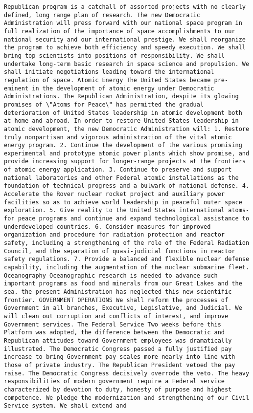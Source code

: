\documentclass[
]{article}
\begin{document}
\begin{verbatim}
Republican program is a catchall of assorted projects with no clearly defined, long range plan of research. The new Democratic Administration will press forward with our national space program in full realization of the importance of space accomplishments to our national security and our international prestige. We shall reorganize the program to achieve both efficiency and speedy execution. We shall bring top scientists into positions of responsibility. We shall undertake long-term basic research in space science and propulsion. We shall initiate negotiations leading toward the international regulation of space. Atomic Energy The United States became pre-eminent in the development of atomic energy under Democratic Administrations. The Republican Administration, despite its glowing promises of \"Atoms for Peace\" has permitted the gradual deterioration of United States leadership in atomic development both at home and abroad. In order to restore United States leadership in atomic development, the new Democratic Administration will: 1. Restore truly nonpartisan and vigorous administration of the vital atomic energy program. 2. Continue the development of the various promising experimental and prototype atomic power plants which show promise, and provide increasing support for longer-range projects at the frontiers of atomic energy application. 3. Continue to preserve and support national laboratories and other Federal atomic installations as the foundation of technical progress and a bulwark of national defense. 4. Accelerate the Rover nuclear rocket project and auxiliary power facilities so as to achieve world leadership in peaceful outer space exploration. 5. Give reality to the United States international atoms-for peace programs and continue and expand technological assistance to underdeveloped countries. 6. Consider measures for improved organization and procedure for radiation protection and reactor safety, including a strengthening of the role of the Federal Radiation Council, and the separation of quasi-judicial functions in reactor safety regulations. 7. Provide a balanced and flexible nuclear defense capability, including the augmentation of the nuclear submarine fleet. Oceanography Oceanographic research is needed to advance such important programs as food and minerals from our Great Lakes and the sea. the present Administration has neglected this new scientific frontier. GOVERNMENT OPERATIONS We shall reform the processes of Government in all branches, Executive, Legislative, and Judicial. We will clean out corruption and conflicts of interest, and improve Government services. The Federal Service Two weeks before this Platform was adopted, the difference between the Democratic and Republican attitudes toward Government employees was dramatically illustrated. The Democratic Congress passed a fully justified pay increase to bring Government pay scales more nearly into line with those of private industry. The Republican President vetoed the pay raise. The Democratic Congress decisively overrode the veto. The heavy responsibilities of modern government require a Federal service characterized by devotion to duty, honesty of purpose and highest competence. We pledge the modernization and strengthening of our Civil Service system. We shall extend and 
\end{verbatim}
\end{document}
